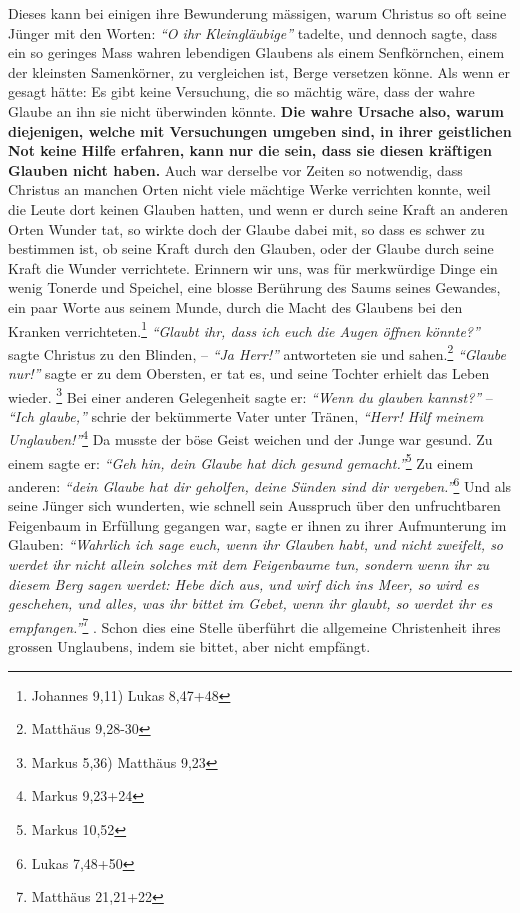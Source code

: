 Dieses kann bei einigen ihre Bewunderung mässigen, warum Christus so oft seine
Jünger mit den Worten:
\textit{"`O ihr Kleingläubige"'} tadelte, und dennoch sagte,
dass ein so geringes Mass wahren lebendigen Glaubens als einem Senfkörnchen,
einem der kleinsten Samenkörner, zu vergleichen ist, Berge versetzen könne. Als
wenn er gesagt hätte: Es gibt keine Versuchung, die so mächtig wäre, dass der
wahre Glaube an ihn sie nicht überwinden könnte. \textbf{Die wahre Ursache also,
warum
diejenigen, welche mit Versuchungen umgeben sind, in ihrer geistlichen Not
keine Hilfe erfahren, kann nur die sein, dass sie diesen kräftigen Glauben nicht
haben.} Auch war derselbe vor Zeiten so notwendig,
dass Christus an manchen
Orten nicht viele mächtige Werke verrichten konnte, weil die Leute dort
keinen Glauben hatten, und wenn er durch seine Kraft an anderen Orten Wunder
tat, so wirkte doch der Glaube dabei mit, so dass es schwer zu bestimmen ist,
ob seine Kraft durch den Glauben, oder der Glaube durch seine Kraft die Wunder
verrichtete. Erinnern wir uns, was für merkwürdige Dinge ein wenig Tonerde und
Speichel, eine blosse Berührung des Saums seines Gewandes, ein paar Worte aus
seinem Munde, durch die Macht des Glaubens bei den Kranken
verrichteten.\footnote{Johannes 9,11) Lukas 8,47+48}
\textit{"`Glaubt ihr, dass ich euch die
Augen öffnen könnte?"'} sagte Christus zu den Blinden, -- \textit{"`Ja Herr!"'}
antworteten
sie und sahen.\footnote{Matthäus 9,28-30}
\textit{"`Glaube nur!"'} sagte er zu dem
Obersten, er tat es, und seine Tochter erhielt das Leben wieder.
\footnote{Markus 5,36) Matthäus 9,23}
Bei einer anderen Gelegenheit sagte er:
\textit{"`Wenn du glauben kannst?"'} --
\textit{"`Ich glaube,"'} schrie der bekümmerte Vater unter Tränen,
\textit{"`Herr! Hilf meinem Unglauben!"'}\footnote{Markus 9,23+24}
Da musste der böse Geist weichen und der
Junge war gesund. Zu einem sagte er:
\textit{"`Geh hin, dein Glaube hat dich gesund gemacht."'}\footnote{Markus
10,52}
Zu einem anderen: \textit{"`dein Glaube hat dir
geholfen, deine Sünden sind dir vergeben."'}\footnote{Lukas 7,48+50}
Und als seine
Jünger sich wunderten, wie schnell sein Ausspruch über den unfruchtbaren
Feigenbaum in Erfüllung gegangen war, sagte er ihnen zu ihrer Aufmunterung im
Glauben:
\textit{"`Wahrlich ich sage euch, wenn ihr Glauben habt, und nicht zweifelt,
so werdet ihr nicht allein solches mit dem Feigenbaume tun, sondern wenn ihr zu
diesem Berg sagen werdet: Hebe dich aus, und wirf dich ins Meer, so wird es
geschehen, und alles, was ihr bittet im Gebet, wenn ihr glaubt, so werdet ihr
es empfangen."'}\footnote{Matthäus 21,21+22}
. Schon dies eine Stelle überführt die
allgemeine Christenheit ihres grossen
Unglaubens, indem sie bittet, aber nicht
empfängt.

